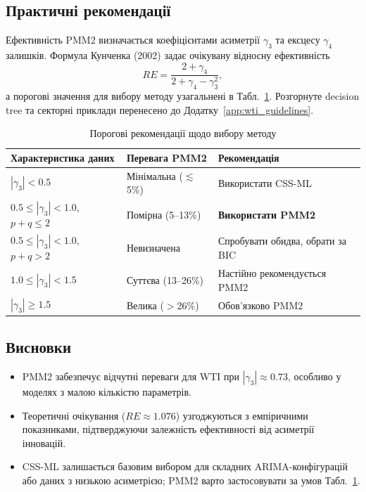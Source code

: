 \documentclass[12pt,a4paper]{article}
\begin{document}
\subsection{Практичні рекомендації}
\label{subsec:wti_practical_recommendations}

Ефективність PMM2 визначається коефіцієнтами асиметрії $\gamma_3$ та ексцесу $\gamma_4$ залишків. Формула Кунченка (2002) задає очікувану відносну ефективність
\begin{equation}
\label{eq:relative_efficiency}
RE = \frac{2 + \gamma_4}{2 + \gamma_4 - \gamma_3^2},
\end{equation}
а порогові значення для вибору методу узагальнені в Табл.~\ref{tab:wti_practical_recommendations}. Розгорнуте decision tree та секторні приклади перенесено до Додатку~\ref{app:wti_guidelines}.

\begin{table}[htbp]
\centering
\caption{Порогові рекомендації щодо вибору методу}
\label{tab:wti_practical_recommendations}
\begin{tabular}{@{}lll@{}}
\toprule
\textbf{Характеристика даних} & \textbf{Перевага PMM2} & \textbf{Рекомендація} \\
\midrule
$|\gamma_3| < 0.5$ & Мінімальна ($\lesssim$5\%) & Використати CSS-ML \\
$0.5 \leq |\gamma_3| < 1.0$, $p+q \leq 2$ & Помірна (5--13\%) & \textbf{Використати PMM2} \\
$0.5 \leq |\gamma_3| < 1.0$, $p+q > 2$ & Невизначена & Спробувати обидва, обрати за BIC \\
$1.0 \leq |\gamma_3| < 1.5$ & Суттєва (13--26\%) & Настійно рекомендується PMM2 \\
$|\gamma_3| \geq 1.5$ & Велика ($>$26\%) & Обов'язково PMM2 \\
\bottomrule
\end{tabular}
\end{table}

\subsection{Висновки}
\label{subsec:wti_empirical_conclusions}

\begin{itemize}
    \item PMM2 забезпечує відчутні переваги для WTI при $|\gamma_3|\approx 0.73$, особливо у моделях з малою кількістю параметрів.
    \item Теоретичні очікування ($RE \approx 1.076$) узгоджуються з емпіричними показниками, підтверджуючи залежність ефективності від асиметрії інновацій.
    \item CSS-ML залишається базовим вибором для складних ARIMA-конфігурацій або даних з низькою асиметрією; PMM2 варто застосовувати за умов Табл.~\ref{tab:wti_practical_recommendations}.
\end{itemize}
\end{document}
